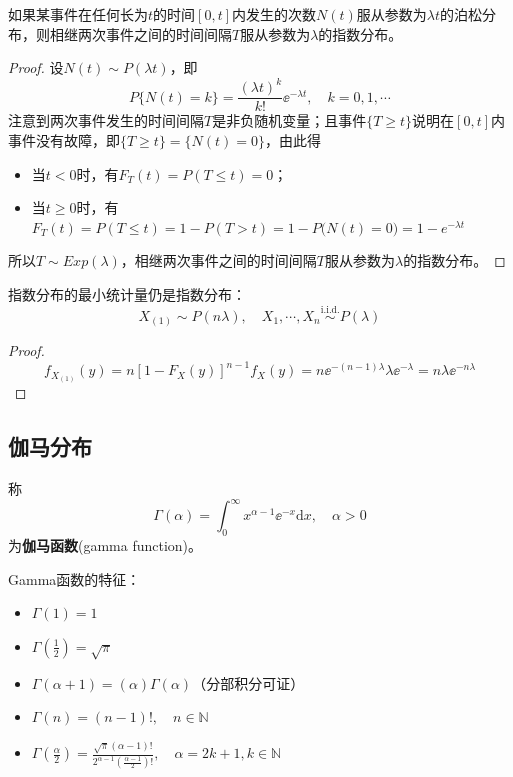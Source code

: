 \begin{proposition}
    如果某事件在任何长为$t$的时间$[0,t]$内发生的次数$N(t)$服从参数为$\lambda t$的泊松分布，则相继两次事件之间的时间间隔$T$服从参数为$\lambda$的指数分布。
\end{proposition}
\begin{proof}
    设$N(t)\sim P(\lambda t)$，即
    \[ P\{ N(t) = k \} = \frac{(\lambda t)^k}{k!} \ee^{-\lambda t},\quad k=0,1,\cdots \]
    注意到两次事件发生的时间间隔$T$是非负随机变量；且事件$\{T\ge t\}$说明在$[0,t]$内事件没有故障，即$\{T\ge t\}=\{N(t)=0\}$，由此得
    \begin{itemize}
        \item 当$t<0$时，有$F_T(t)=P(T\le t)=0$；
        \item 当$t\ge0$时，有$F_T(t) = P(T\le t) = 1 - P(T>t) = 1 -P\big( N(t)=0 \big) = 1 - e^{-\lambda t}$
    \end{itemize}
    所以$T\sim Exp(\lambda)$，相继两次事件之间的时间间隔$T$服从参数为$\lambda$的指数分布。
\end{proof}

\begin{proposition}
    指数分布的最小统计量仍是指数分布：
    \[ X_{(1)} \sim P(n \lambda) ,\quad X_1,\cdots ,X_n \overset{\text{i.i.d.}}{\sim} P(\lambda) \]
\end{proposition}
\begin{proof}
    \[ f_{X_{(1)}}(y)=n[1-F_X(y)]^{n-1}f_X(y)=n \ee^{-(n-1)\lambda} \lambda \ee^{-\lambda} =n \lambda \ee^{-n\lambda} \]
\end{proof}

\subsection{伽马分布}

\begin{definition}
    称
    \[ \Gamma(\alpha)=\int_0^{\infty}x^{\alpha-1}\ee^{-x}\mathrm{d}x ,\quad \alpha > 0\]
    为\textbf{伽马函数}(gamma function)。
\end{definition}

Gamma函数的特征：
\begin{itemize}
    \item $\Gamma(1)=1$
    \item $\Gamma(\frac{1}{2})=\sqrt{\pi}$
    \item $\Gamma(\alpha+1)=(\alpha)\Gamma(\alpha)$（分部积分可证）
    \item $\Gamma(n)=(n-1)!,\quad n \in \mathbb{N}$
    \item $\Gamma(\frac{\alpha}{2})=\frac{\sqrt{\pi}(\alpha-1)!}{2^{\alpha-1}(\frac{\alpha-1}{2})!}, \quad \alpha=2k+1,k \in \mathbb{N}$
\end{itemize}

